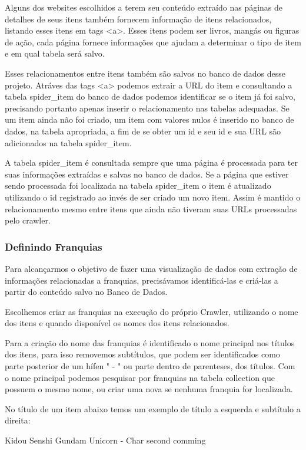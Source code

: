 \documentclass[12pt]{article}
\begin{document}
Alguns dos websites escolhidos a terem seu conteúdo extraído nas páginas de detalhes de seus itens também fornecem informação de itens relacionados, listando esses itens em tags <a>. Esses itens podem ser livros, mangás ou figuras de ação, cada página fornece informações que ajudam a determinar o tipo de item e em qual tabela será salvo.

Esses relacionamentos entre itens também são salvos no banco de dados desse projeto. Atráves das tags <a> podemos extrair a URL do item e consultando a tabela spider\_item do banco de dados podemos identificar se o item já foi salvo, precisando portanto apenas inserir o relacionamento nas tabelas adequadas. Se um item ainda não foi criado, um item com valores nulos é inserido no banco de dados, na tabela apropriada, a fim de se obter um id e seu id e sua URL são adicionados na tabela spider\_item.

A tabela spider\_item é consultada sempre que uma página é processada para ter suas informações extraídas e salvas no banco de dados. Se a página que estiver sendo processada foi localizada na tabela spider\_item o item é atualizado utilizando o id registrado ao invés de ser criado um novo item. Assim é mantido o relacionamento mesmo entre itens que ainda não tiveram suas URLs processadas pelo crawler.

\subsubsection{Definindo Franquias}

Para alcançarmos o objetivo de fazer uma visualização de dados com extração de informações relacionadas a franquias, precisávamos identificá-las e criá-las a partir do conteúdo salvo no Banco de Dados. 

Escolhemos criar as franquias na execução do próprio Crawler, utilizando o nome dos itens e quando disponível os nomes dos itens relacionados.

Para a criação do nome das franquias é identificado o nome principal nos títulos dos itens, para isso removemos subtítulos, que podem ser identificados como parte posterior de um hífen " - " ou parte dentro de parenteses, dos títulos. Com o nome principal podemos pesquisar por franquias na tabela collection que possuem o mesmo nome, ou criar uma nova se nenhuma franquia for localizada.

No título de um item abaixo temos um exemplo de título a esquerda e subtítulo a direita:

Kidou Senshi Gundam Unicorn - Char second comming
\end{document}
